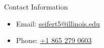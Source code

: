 \documentclass[final]{beamer}
\newlength{\sepwid}
\newlength{\onecolwid}
\newlength{\threecolwid}
\begin{document}
\begin{frame}[t]
\begin{columns}[t,totalwidth=\threecolwid]
\begin{column}{\onecolwid}
\begin{alertblock}{Contact Information}
	\begin{itemize}
		\item Email: \href{mailto:seifert5@illinois.edu}{seifert5@illinois.edu}
		\item Phone: \href{tel:18652790603}{+1 865 279 0603}
	\end{itemize}
	
\end{alertblock}






%
%
%
%
% 
%
%

\end{column} %

\begin{column}{\sepwid}\end{column} %



\begin{column}{\onecolwid} %


\end{column}
\end{columns}
\end{frame}
\end{document}
